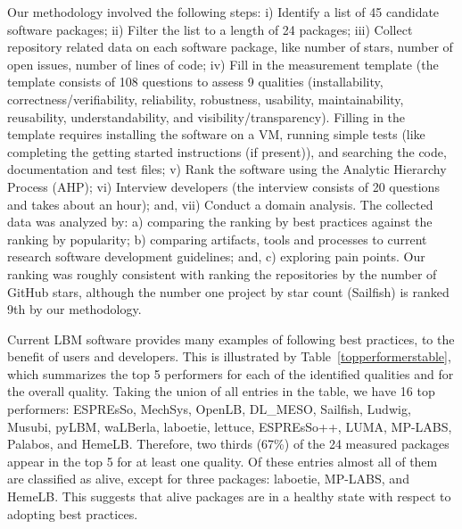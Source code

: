\documentclass[final, 3p, times, authoryear]{elsarticle}
\begin{document}
Our methodology involved the following steps: i) Identify a list of 45 candidate
software packages; ii) Filter the list to a length of 24 packages; iii) Collect
repository related data on each software package, like number of stars, number
of open issues, number of lines of code; iv) Fill in the measurement template
(the template consists of 108 questions to assess 9 qualities (installability,
correctness/verifiability, reliability, robustness, usability, maintainability,
reusability, understandability, and visibility/transparency).  Filling in the
template requires installing the software on a VM, running simple tests (like
completing the getting started instructions (if present)), and searching the
code, documentation and test files; v) Rank the software using the Analytic
Hierarchy Process (AHP); vi) Interview developers (the interview consists of 20
questions and takes about an hour); and, vii) Conduct a domain analysis. The
collected data was analyzed by: a) comparing the ranking by best practices
against the ranking by popularity; b) comparing artifacts, tools and processes
to current research software development guidelines; and, c) exploring pain
points.  Our ranking was roughly consistent with ranking the repositories by the
number of GitHub stars, although the number one project by star count (Sailfish)
is ranked 9th by our methodology.

Current LBM software provides many examples of following best practices, to the
benefit of users and developers.  This is illustrated by
Table~\ref{topperformerstable}, which summarizes the top 5 performers for each of
the identified qualities and for the overall quality. Taking the union of all
entries in the table, we have 16 top performers: ESPREsSo, MechSys, OpenLB,
DL\_MESO, Sailfish, Ludwig, Musubi, pyLBM, waLBerla, laboetie, lettuce,
ESPREsSo++, LUMA, MP-LABS, Palabos, and HemeLB.  Therefore, two thirds (67\%) of
the 24 measured packages appear in the top 5 for at least one quality.  Of these
entries almost all of them are classified as alive, except for three packages:
laboetie, MP-LABS, and HemeLB.  This suggests that alive packages are in a
healthy state with respect to adopting best practices.
\end{document}
